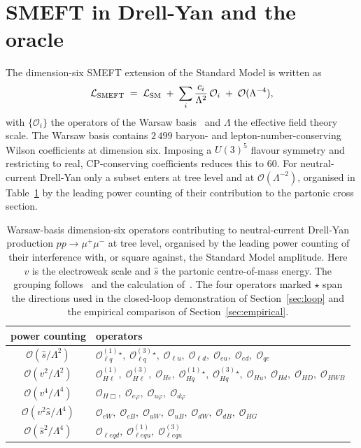 \documentclass[11pt,a4paper]{article}
\newcommand{\Lam}{\Lambda}
\begin{document}
\section{SMEFT in Drell-Yan and the oracle}
\label{sec:theory}

The dimension-six SMEFT extension of the Standard Model is written as
\begin{equation}
  \mathcal{L}_{\rm SMEFT} \;=\; \mathcal{L}_{\rm SM} \;+\; \sum_i \frac{c_i}{\Lam^2}\,\mathcal{O}_i \;+\; \mathcal{O}(\Lam^{-4}),
  \label{eq:smeft-lag}
\end{equation}
with $\{\mathcal{O}_i\}$ the operators of the Warsaw basis~\cite{Grzadkowski:2010es} and $\Lam$ the effective field theory scale. The Warsaw basis contains $2\,499$ baryon- and lepton-number-conserving Wilson coefficients at dimension six. Imposing a $U(3)^5$ flavour symmetry and restricting to real, CP-conserving coefficients reduces this to $60$. For neutral-current Drell-Yan only a subset enters at tree level and at $\mathcal{O}(\Lam^{-2})$, organised in Table~\ref{tab:operators} by the leading power counting of their contribution to the partonic cross section.

\begin{table}[t]
\centering\small
\caption{\label{tab:operators} Warsaw-basis dimension-six operators contributing to neutral-current Drell-Yan production $pp \to \mu^+\mu^-$ at tree level, organised by the leading power counting of their interference with, or square against, the Standard Model amplitude. Here $v$ is the electroweak scale and $\hat{s}$ the partonic centre-of-mass energy. The grouping follows~\cite{DasBakshi:2025reusable} and the calculation of~\cite{Greljo:2017vvb}. The four operators marked $\star$ span the directions used in the closed-loop demonstration of Section~\ref{sec:loop} and the empirical comparison of Section~\ref{sec:empirical}.}
\begin{tabular}{cl}
\toprule
power counting & operators \\
\midrule
$\mathcal{O}(\hat{s}/\Lam^2)$    & $\mathcal{O}_{\ell q}^{(1)}{}^\star,\;\mathcal{O}_{\ell q}^{(3)}{}^\star,\;\mathcal{O}_{\ell u},\;\mathcal{O}_{\ell d},\;\mathcal{O}_{eu},\;\mathcal{O}_{ed},\;\mathcal{O}_{qe}$ \\
$\mathcal{O}(v^2/\Lam^2)$       & $\mathcal{O}_{H\ell}^{(1)},\;\mathcal{O}_{H\ell}^{(3)},\;\mathcal{O}_{He},\;\mathcal{O}_{Hq}^{(1)}{}^\star,\;\mathcal{O}_{Hq}^{(3)}{}^\star,\;\mathcal{O}_{Hu},\;\mathcal{O}_{Hd},\;\mathcal{O}_{HD},\;\mathcal{O}_{HWB}$ \\
$\mathcal{O}(v^4/\Lam^4)$       & $\mathcal{O}_{H\Box},\;\mathcal{O}_{e\varphi},\;\mathcal{O}_{u\varphi},\;\mathcal{O}_{d\varphi}$ \\
$\mathcal{O}(v^2\hat{s}/\Lam^4)$& $\mathcal{O}_{eW},\;\mathcal{O}_{eB},\;\mathcal{O}_{uW},\;\mathcal{O}_{uB},\;\mathcal{O}_{dW},\;\mathcal{O}_{dB},\;\mathcal{O}_{HG}$ \\
$\mathcal{O}(\hat{s}^2/\Lam^4)$ & $\mathcal{O}_{\ell e q d},\;\mathcal{O}_{\ell e q u}^{(1)},\;\mathcal{O}_{\ell e q u}^{(3)}$ \\
\bottomrule
\end{tabular}
\end{table}
\end{document}
